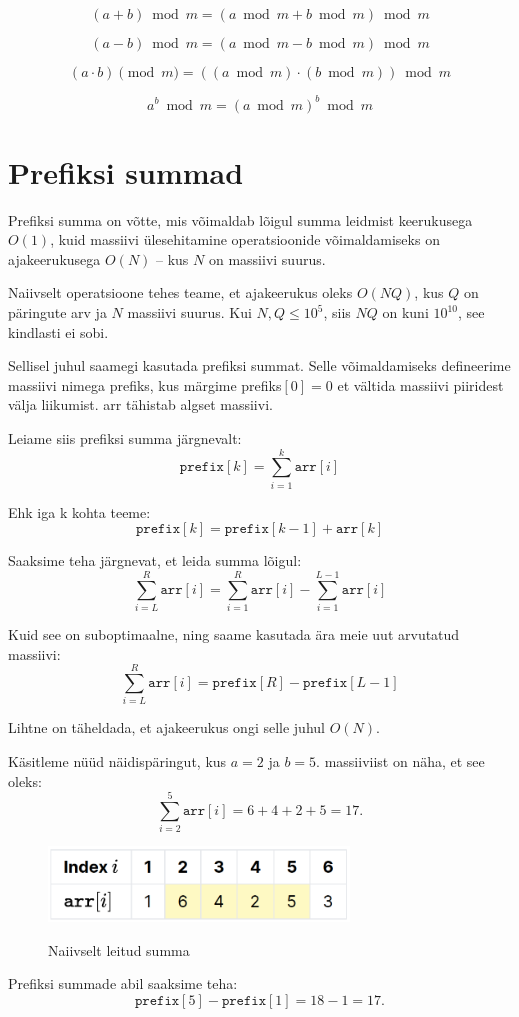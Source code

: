 \documentclass{trkut}
\theoremstyle{definition}
\begin{document}
\begin{appendices}
$$(a+b) \bmod m = (a \bmod m + b \bmod m) \bmod m$$

$$(a-b) \bmod m = (a \bmod m - b \bmod m) \bmod m$$

$$(a \cdot b) \pmod{m} = ((a \bmod m) \cdot (b \bmod m)) \bmod m$$

$$a^b \bmod {m} = (a \bmod m)^b \bmod m$$


 \chapter{Prefiksi summad}\label{lisa11}
    \tiny
    \normalsize
Prefiksi summa on võtte, mis võimaldab lõigul summa leidmist keerukusega $O(1)$, kuid massiivi ülesehitamine operatsioonide võimaldamiseks on ajakeerukusega $O(N)$ -- kus $N$ on massiivi suurus.

Naiivselt operatsioone tehes teame, et ajakeerukus oleks $O(NQ)$, kus $Q$ on päringute arv ja $N$ massiivi suurus.
Kui $N, Q \leq 10^5$, siis $NQ$ on kuni $10^{10}$, see kindlasti ei sobi.

Sellisel juhul saamegi kasutada prefiksi summat.
Selle võimaldamiseks defineerime massiivi nimega prefiks, kus märgime prefiks$[0]=0$ et vältida massiivi piiridest välja liikumist.
arr tähistab algset massiivi.

Leiame siis prefiksi summa järgnevalt:
$$
\texttt{prefix}[k]=\sum_{i=1}^{k} \texttt{arr}[i]
$$

Ehk iga k kohta teeme:
$$
\texttt{prefix}[k]=\texttt{prefix}[k-1]+\texttt{arr}[k]
$$

Saaksime teha järgnevat, et leida summa lõigul: 
$$
\sum_{i=L}^{R} \texttt{arr}[i] = \sum_{i=1}^{R} \texttt{arr}[i] - \sum_{i=1}^{L-1} \texttt{arr}[i]
$$

Kuid see on suboptimaalne, ning saame kasutada ära meie uut arvutatud massiivi: 
$$
\sum_{i=L}^{R} \texttt{arr}[i]= \texttt{prefix}[R]-\texttt{prefix}[L-1]
$$

Lihtne on täheldada, et ajakeerukus ongi selle juhul $O(N)$.

Käsitleme nüüd näidispäringut, kus $a = 2$ ja $b = 5$.
massiiviist on näha, et see oleks:
$$
\sum_{i=2}^{5} \texttt{arr}[i] = 6 + 4 + 2 + 5 = 17.
$$
\begin{figure}[H]%
    \includegraphics[width=8cm]{PrefixMassiiv1.png}%
    \caption{Naiivselt leitud summa}%
    \label{EMaxx}%
\end{figure}
Prefiksi summade abil saaksime teha:
$$
\texttt{prefix}[5] - \texttt{prefix}[1] = 18 - 1 = 17.
$$


\end{appendices}
\end{document}
